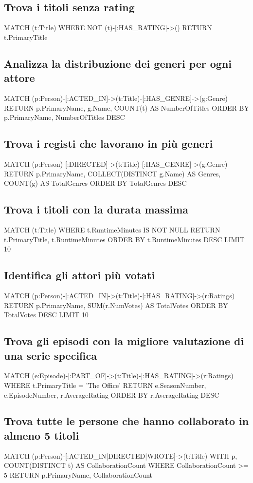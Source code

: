 \documentclass[a4paper,12pt]{article}
\begin{document}
\subsection{Trova i titoli senza rating}
MATCH (t:Title)
WHERE NOT (t)-[:HAS_RATING]->()
RETURN t.PrimaryTitle

\subsection{Analizza la distribuzione dei generi per ogni attore}
MATCH (p:Person)-[:ACTED_IN]->(t:Title)-[:HAS_GENRE]->(g:Genre)
RETURN p.PrimaryName, g.Name, COUNT(t) AS NumberOfTitles
ORDER BY p.PrimaryName, NumberOfTitles DESC

\subsection{Trova i registi che lavorano in più generi}
MATCH (p:Person)-[:DIRECTED]->(t:Title)-[:HAS_GENRE]->(g:Genre)
RETURN p.PrimaryName, COLLECT(DISTINCT g.Name) AS Genres, COUNT(g) AS TotalGenres
ORDER BY TotalGenres DESC

\subsection{Trova i titoli con la durata massima}
MATCH (t:Title)
WHERE t.RuntimeMinutes IS NOT NULL
RETURN t.PrimaryTitle, t.RuntimeMinutes
ORDER BY t.RuntimeMinutes DESC
LIMIT 10

\subsection{Identifica gli attori più votati}
MATCH (p:Person)-[:ACTED_IN]->(t:Title)-[:HAS_RATING]->(r:Ratings)
RETURN p.PrimaryName, SUM(r.NumVotes) AS TotalVotes
ORDER BY TotalVotes DESC
LIMIT 10

\subsection{Trova gli episodi con la migliore valutazione di una serie specifica}
MATCH (e:Episode)-[:PART_OF]->(t:Title)-[:HAS_RATING]->(r:Ratings)
WHERE t.PrimaryTitle = 'The Office'
RETURN e.SeasonNumber, e.EpisodeNumber, r.AverageRating
ORDER BY r.AverageRating DESC

\subsection{Trova tutte le persone che hanno collaborato in almeno 5 titoli}
MATCH (p:Person)-[:ACTED_IN|DIRECTED|WROTE]->(t:Title)
WITH p, COUNT(DISTINCT t) AS CollaborationCount
WHERE CollaborationCount >= 5
RETURN p.PrimaryName, CollaborationCount
\end{document}
